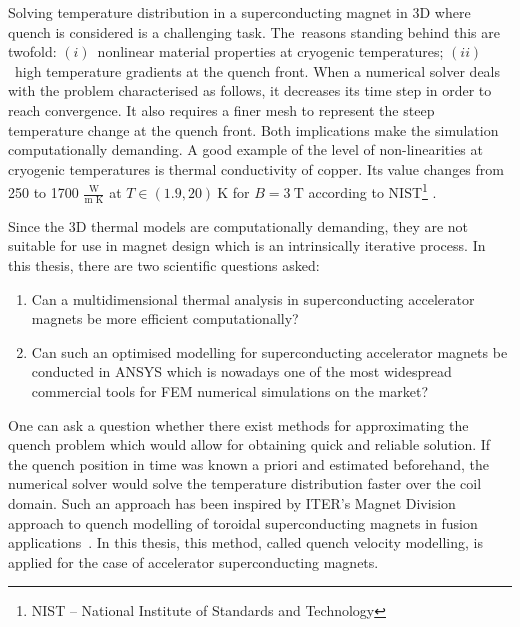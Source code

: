 
Solving temperature distribution in a superconducting magnet in 3D where quench is considered is a challenging task. The~reasons standing behind this are twofold: $(i)$~nonlinear material properties at cryogenic temperatures; $(ii)$~high temperature gradients at the quench front. When a numerical solver deals with the problem characterised as follows, it decreases its time step in order to reach convergence. It also requires a finer mesh to represent the steep temperature change at the quench front. Both implications make the simulation computationally demanding. A good example of the level of non-linearities at cryogenic temperatures is thermal conductivity of copper. Its value changes from 250 to 1700 $\frac{\text{W}}{\text{m K}}$ at $T \in (1.9, 20)~\text{K}$ for $B=3~\text{T}$ according to NIST\footnote{NIST -- National Institute of Standards and Technology} \cite[p.~9-13]{material_properties_roxie}.

Since the 3D thermal models are computationally demanding, they are not suitable for use in magnet design which is an intrinsically iterative process. In this thesis, there are two scientific questions asked:

\begin{enumerate}
\item Can a multidimensional thermal analysis in superconducting accelerator magnets be more efficient computationally?
\item  Can such an optimised modelling for superconducting accelerator magnets be conducted in ANSYS which is nowadays one of the most widespread commercial tools for FEM numerical simulations on the market?
\end{enumerate}

One can ask a question whether there exist methods for approximating the quench problem which would allow for obtaining quick and reliable solution. If the quench position in time was known a priori and estimated beforehand, the numerical solver would solve the temperature distribution faster over the coil domain. Such an approach has been inspired by ITER's Magnet Division approach to quench modelling of toroidal superconducting magnets in fusion applications~\cite{iter_presentation_qualified_analysis, iter_fault_case_study}. In this thesis, this method, called quench velocity modelling, is applied for the case of accelerator superconducting magnets. 
